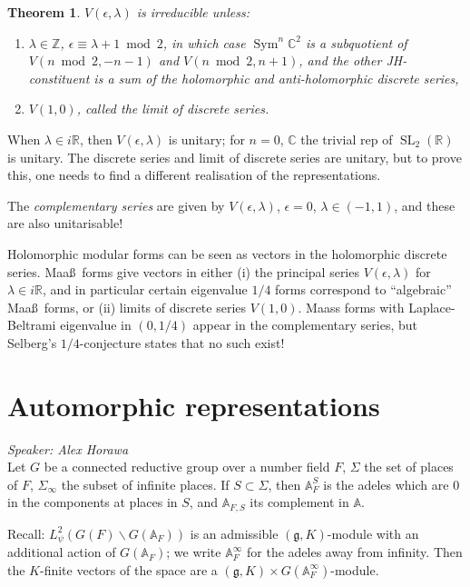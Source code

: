 \documentclass[11pt]{report}
\let\mbb\mathbb
\let\mf\mathfrak
\newcommand{\1}{\mathbbm 1}
\newcommand{\Z}{\mathbb{Z}}
\newcommand{\R}{\mathbb{R}}
\newcommand{\g}{\mf g}
\newcommand{\C}{\mathbb{C}}
\newcommand{\A}{\mbb A}
\DeclareMathOperator{\Sym}{Sym}
\DeclareMathOperator{\SL}{SL}
\theoremstyle{plain}
\newtheorem{thm}{Theorem}[section]
\newcounter{ex}
\theoremstyle{definition}
\theoremstyle{remark}
\numberwithin{equation}{section}
\begin{document}
\begin{thm}
  $V(\epsilon,\lambda)$ is irreducible unless:
  \begin{enumerate}
  \item $\lambda \in \Z$, $\epsilon \equiv \lambda +1 \bmod{2}$, in which case
    $\Sym^{n}\C^{2}$ is a subquotient of $V(n \bmod{2}, -n-1)$ and
    $V(n \bmod{2}, n+1)$, and the other JH-constituent is a sum of the
    \emph{holomorphic and anti-holomorphic discrete
      series},
  \item $V(1,0)$, called the \emph{limit of discrete
      series}.
  \end{enumerate}
\end{thm}

When $\lambda \in i\R$, then $V(\epsilon,\lambda)$ is unitary; for $n=0$, $\C$ the trivial
rep of $\SL_{2}(\R)$ is unitary. The discrete series and limit of
discrete series are unitary, but to prove this, one needs to find a
different realisation of the representations.

The \emph{complementary series} are given by $V(\epsilon,\lambda)$,  $\epsilon = 0$, $\lambda \in
(-1,1)$, and these are also unitarisable!

Holomorphic modular forms can be seen as vectors in the holomorphic
discrete series. Maa\ss\ forms give vectors in either (i) the
principal series $V(\epsilon,\lambda)$ for $\lambda \in i\R$, and in particular certain
eigenvalue $1/4$ forms correspond to ``algebraic'' Maa\ss\ forms, or
(ii) limits of discrete series $V(1,0)$. Maass forms with
Laplace-Beltrami eigenvalue in $(0,1/4)$ appear in the complementary
series, but Selberg's $1/4$-conjecture states that no such exist!

\section{Automorphic representations}
\label{sec:autom-repr}
\emph{Speaker: Alex Horawa}\\ 
Let $G$ be a connected reductive group over a number field $F$, $\Sigma$
the set of places of $F$, $\Sigma_{\infty}$ the subset of infinite places. If
$S \subset \Sigma$, then $\A^{S}_{F}$ is the adeles which are $0$ in the
components at places in $S$, and $\A_{F,S}$ its complement in $\A$. 


Recall: $L^{2}_{\psi}(G(F) \backslash G(\A_{F}))$ is an admissible $(\g,K)$-module
with an additional action of $G(\A_{F})$; we write $\A^{\infty}_{F}$ for
the adeles away from infinity. Then the $K$-finite vectors of the
space are a $(\g,K)\times G(\A^{\infty}_{F})$-module.
\end{document}
